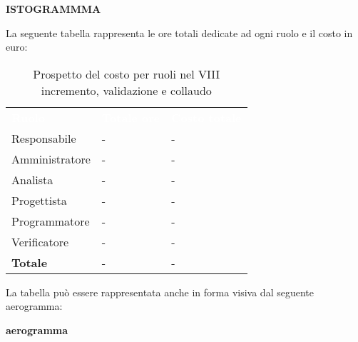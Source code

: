 \textbf{ISTOGRAMMMA}


La seguente tabella rappresenta le ore totali dedicate ad ogni ruolo e il costo in euro:

\begin{table}[!htbp]
\begin{center}
\renewcommand{\arraystretch}{1.5}
\begin{tabular}{ m{}<{\centering}  m{}<{\centering} m{}<{\centering}}
	\rowcolor{darkblue}
	\textcolor{white}{\textbf{Ruolo}}&\textcolor{white}{\textbf{Totale ore}}&\textcolor{white}{\textbf{Costo totale}}\\ 

	Responsabile  & - & - \\	

	Amministratore & - & - \\
	
	Analista & - & - \\
	
	Progettista & - & - \\
	
	Programmatore & - & - \\
	
	Verificatore & - & - \\
	
	\textbf{Totale} & - & - \\
	
\end{tabular}
\caption{Prospetto del costo per ruoli nel VIII incremento,  validazione e collaudo}
\end{center}
\end{table}

La tabella può essere rappresentata anche in forma visiva dal seguente aerogramma:

\textbf{aerogramma}


